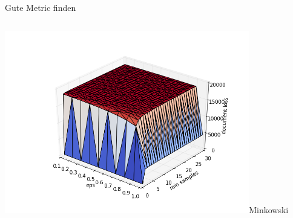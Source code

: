\documentclass[compress,t]{beamer}
\begin{document}
\begin{frame}{Gute Metric finden}
\begin{columns}[t]
        \includegraphics[width=0.8\textwidth]{img/4_minkowski_p_2_0.png}{Minkowski}
    \end{columns}

\end{frame}
\end{document}
